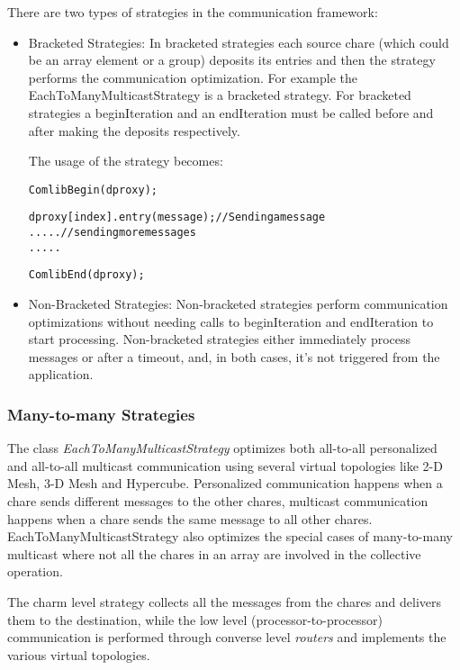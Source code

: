 {There are two types of strategies in the communication framework:

\begin{itemize}

\item \label{bracketed strategies}
Bracketed Strategies: In bracketed strategies each source chare (which could be
an array element or a group) deposits its entries and then the strategy performs
the communication optimization. For example the EachToManyMulticastStrategy is a
bracketed strategy. For bracketed strategies a beginIteration and an
endIteration must be called before and after making the deposits respectively.

The usage of the strategy becomes:

\begin{alltt}
ComlibBegin(dproxy);

dproxy[index].entry(message);   // Sending a message
.....     //sending more messages
.....

ComlibEnd(dproxy);
\end{alltt}

\item Non-Bracketed Strategies: Non-bracketed strategies perform communication
optimizations without needing calls to beginIteration and endIteration to start
processing. Non-bracketed strategies either immediately process messages or
after a timeout, and, in both cases, it's not triggered from the application.

\end{itemize}


\subsubsection{Many-to-many Strategies}

The class {\em EachToManyMulticastStrategy} optimizes both all-to-all
personalized and all-to-all multicast communication using several virtual
topologies like 2-D Mesh, 3-D Mesh and Hypercube. Personalized communication
happens when a chare sends different messages to the other chares, multicast
communication happens when a chare sends the same message to all other chares.
EachToManyMulticastStrategy also optimizes the special cases of many-to-many multicast where
not all the chares in an array are involved in the collective operation.

The charm level strategy collects all the messages from the chares and delivers
them to the destination, while the low level (processor-to-processor)
communication is performed through converse level {\em routers} and
implements the various virtual topologies.

}
